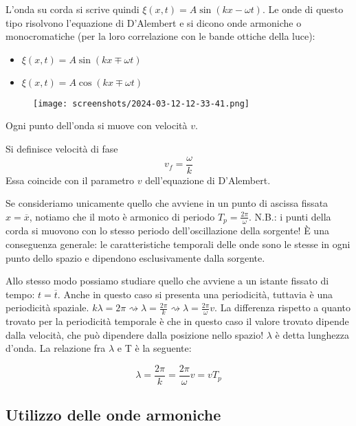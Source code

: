 L'onda su corda si scrive quindi \(\xi (x,t) = A \sin (kx - \omega t)\). Le onde di questo tipo risolvono l'equazione di D'Alembert e si dicono onde armoniche o monocromatiche (per la loro correlazione con le bande ottiche della luce):
\begin{itemize}
	\item \(\xi (x,t) = A \sin (kx \mp \omega t)\)
	\item \(\xi (x,t) = A \cos (kx \mp \omega t)\)  
\end{itemize}
\begin{figure}[H]
	\centering
	\texttt{[image: screenshots/2024-03-12-12-33-41.png]}
\end{figure}
Ogni punto dell'onda si muove con velocità \(v\).
\begin{definition}
	Si definisce velocità di fase
	\[
		v_f = \frac{\omega }{k}
	\]
	Essa coincide con il parametro \(v\) dell'equazione di D'Alembert.
\end{definition}
Se consideriamo unicamente quello che avviene in un punto di ascissa fissata \(x=\overline{x} \), notiamo che il moto è armonico di periodo \(T_p = \frac{2\pi }{\omega }\). N.B.: i punti della corda si muovono con lo stesso periodo dell'oscillazione della sorgente! È una conseguenza generale: le caratteristiche temporali delle onde sono le stesse in ogni punto dello spazio e dipendono esclusivamente dalla sorgente.

Allo stesso modo possiamo studiare quello che avviene a un istante fissato di tempo: \(t=\overline{t} \). Anche in questo caso si presenta una periodicità, tuttavia è una periodicità spaziale. \(k \lambda = 2\pi \rightsquigarrow \lambda = \frac{2\pi }{k} \rightsquigarrow \lambda = \frac{2 \pi }{\omega } v\). La differenza rispetto a quanto trovato per la periodicità temporale è che in questo caso il valore trovato dipende dalla velocità, che può dipendere dalla posizione nello spazio! \(\lambda \) è detta lunghezza d'onda. La relazione fra \(\lambda \) e T è la seguente:
\begin{definition}
\[
	\lambda = \frac{2 \pi }{k}= \frac{2\pi }{\omega }v= vT_p
\]
\end{definition}

\subsection{Utilizzo delle onde armoniche}

